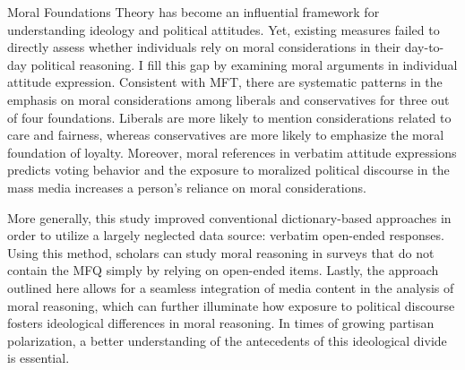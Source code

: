 \documentclass[12pt]{article}
\begin{document}
Moral Foundations Theory has become an influential framework for understanding ideology and political attitudes. Yet, existing measures failed to directly assess whether individuals rely on moral considerations in their day-to-day political reasoning. I fill this gap by examining moral arguments in individual attitude expression. Consistent with MFT, there are systematic patterns in the emphasis on moral considerations among liberals and conservatives for three out of four foundations. Liberals are more likely to mention considerations related to care and fairness, whereas conservatives are more likely to emphasize the moral foundation of loyalty. Moreover, moral references in verbatim attitude expressions predicts voting behavior and the exposure to moralized political discourse in the mass media increases a person's reliance on moral considerations. 

More generally, this study improved conventional dictionary-based approaches in order to utilize a largely neglected data source: verbatim open-ended responses. Using this method, scholars can study moral reasoning in surveys that do not contain the MFQ simply by relying on open-ended items. Lastly, the approach outlined here allows for a seamless integration of media content in the analysis of moral reasoning, which can further illuminate how exposure to political discourse fosters ideological differences in moral reasoning. In times of growing partisan polarization, a better understanding of the antecedents of this ideological divide is essential.




\end{document}
